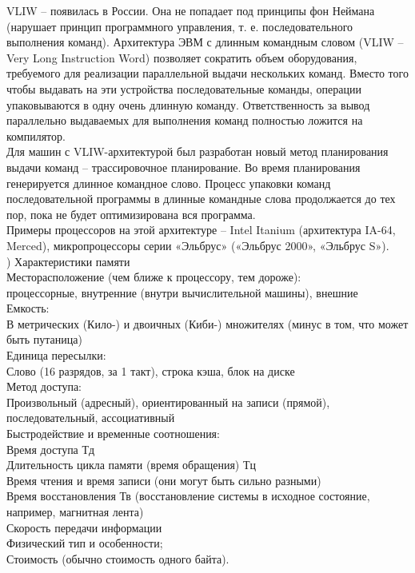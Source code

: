\noindent VLIW – появилась в России. Она не попадает под принципы фон Неймана (нарушает принцип программного управления, т. е. последовательного выполнения команд). Архитектура ЭВМ с длинным командным словом (VLIW – Very Long Instruction Word) позволяет сократить объем оборудования, требуемого для реализации параллельной выдачи нескольких команд. Вместо того чтобы выдавать на эти устройства последовательные команды, операции упаковываются в одну очень длинную команду. Ответственность за вывод параллельно выдаваемых для выполнения команд полностью ложится на компилятор. \\
Для машин с VLIW-архитектурой был разработан новый метод планирования выдачи команд – трассировочное планирование. Во время планирования генерируется длинное командное слово. Процесс упаковки команд последовательной программы в длинные командные слова продолжается до тех пор, пока не будет оптимизирована вся программа. \\
Примеры процессоров на этой архитектуре – Intel Itanium (архитектура IA-64, Merced), микропроцессоры серии «Эльбрус» («Эльбрус 2000», «Эльбрус S»). \\

) Характеристики памяти \\
Месторасположение (чем ближе к процессору, тем дороже): \\
процессорные, внутренние (внутри вычислительной машины), внешние \\
Емкость: \\
В метрических (Кило-) и двоичных (Киби-) множителях (минус в том, что может быть путаница) \\
Единица пересылки: \\
Слово (16 разрядов, за 1 такт), строка кэша, блок на диске \\
Метод доступа: \\
Произвольный (адресный), ориентированный на записи (прямой), последовательный, ассоциативный \\
Быстродействие и временные соотношения: \\
Время доступа Тд \\
Длительность цикла памяти (время обращения) Тц \\
Время чтения и время записи (они могут быть сильно разными) \\
Время восстановления Тв (восстановление системы в исходное состояние, например, магнитная лента) \\
Скорость передачи информации \\
Физический тип и особенности; \\
Стоимость (обычно стоимость одного байта). \\

